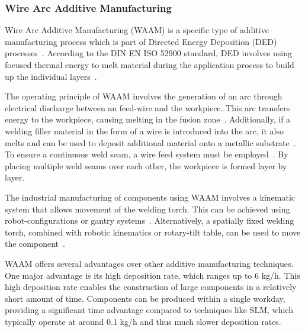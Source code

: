 

\subsubsection{Wire Arc Additive Manufacturing}
Wire Arc Additive Manufacturing (WAAM) is a specific type of additive manufacturing process which is part of Directed Energy Deposition (DED) processes~\cite{Svetlizky.2021}. According to the DIN EN ISO 52900 standard, DED involves using focused thermal energy to melt material during the application process to build up the individual layers~\cite{Additive}. 

The operating principle of WAAM involves the generation of an arc through electrical discharge between an feed-wire and the workpiece. This arc transfers energy to the workpiece, causing melting in the fusion zone~\cite{Ou.2018}. Additionally, if a welding filler material in the form of a wire is introduced into the arc, it also melts and can be used to deposit additional material onto a metallic substrate~\cite{Cunningham.2018}. To ensure a continuous weld seam, a wire feed system must be employed~\cite{Ding.2015}. By placing multiple weld seams over each other, the workpiece is formed layer by layer.


The industrial manufacturing of components using WAAM involves a kinematic system that allows movement of the welding torch. This can be achieved using robot-configurations or gantry systems~\cite{Schmitz.2021}. Alternatively, a spatially fixed welding torch, combined with robotic kinematics or rotary-tilt table, can be used to move the component~\cite{Nagasai.2022}. %


WAAM offers several advantages over other additive manufacturing techniques. One major advantage is its high deposition rate, which ranges up to 6 kg/h. This high deposition rate enables the construction of large components in a relatively short amount of time. Components can be produced within a single workday, providing a significant time advantage compared to techniques like SLM, which typically operate at around 0.1 kg/h and thus much slower deposition rates. \cite{IvanTabernero.2018} 

